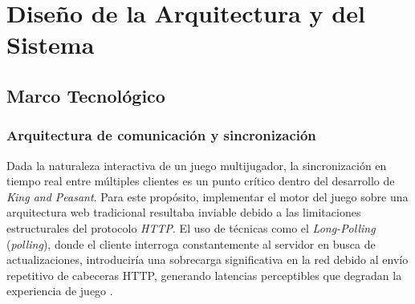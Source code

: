 \chapter{Diseño de la Arquitectura y del Sistema}

\sloppy
\label{sec:arquitectura}

\begin{abstract}
En este capítulo se detalla y justifica la elección del stack tecnológico, abordando la arquitectura de comunicación mediante WebSockets, el entorno de ejecución asíncrono en Node.js, el renderizado reactivo con React y un sistema de persistencia dual basado en MariaDB y Redis. A continuación, se expone la estrategia de contenedorización con Docker y la política de pruebas automatizadas para garantizar la calidad y portabilidad del sistema.

Por otro lado, se describe  la materialización técnica, el diseño arquitectónico y la infraestructura tecnológica adoptada para dar solución al sistema analizado previamente. Se detalla la estructura estructural global orientada a componentes bajo un modelo cliente-servidor desacoplado, la justificación de los patrones de diseño en cada subsistema, la topología de red para el tiempo real, así como el diseño de la persistencia híbrida y las medidas de seguridad para la transferencia asimétrica de datos.
\end{abstract}

\section{Marco Tecnológico}

\subsection{Arquitectura de comunicación y sincronización}

Dada la naturaleza interactiva de un juego multijugador, la sincronización en tiempo real entre múltiples clientes es un punto crítico dentro del desarrollo de \textit{King and Peasant}. Para este propósito, implementar el motor del juego sobre una arquitectura web tradicional resultaba inviable debido a las limitaciones estructurales del protocolo \textit{HTTP}. El uso de técnicas como el \textit{Long-Polling} (\textit{polling}), donde el cliente interroga constantemente al servidor en busca de actualizaciones, introduciría una sobrecarga significativa en la red debido al envío repetitivo de cabeceras HTTP, generando latencias perceptibles que degradan la experiencia de juego \cite{rfc6202}.

